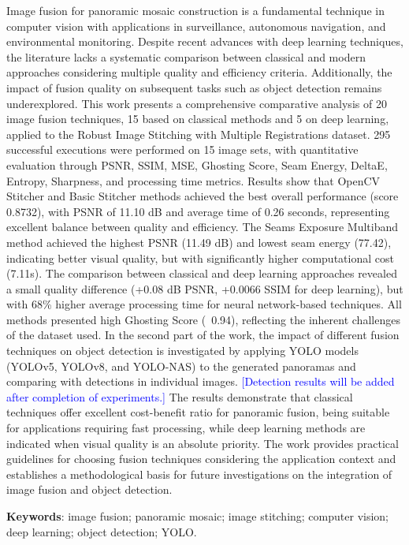 
\begin{abstractutfpr}%

Image fusion for panoramic mosaic construction is a fundamental technique in computer vision with applications in surveillance, autonomous navigation, and environmental monitoring. Despite recent advances with deep learning techniques, the literature lacks a systematic comparison between classical and modern approaches considering multiple quality and efficiency criteria. Additionally, the impact of fusion quality on subsequent tasks such as object detection remains underexplored. This work presents a comprehensive comparative analysis of 20 image fusion techniques, 15 based on classical methods and 5 on deep learning, applied to the Robust Image Stitching with Multiple Registrations dataset. 295 successful executions were performed on 15 image sets, with quantitative evaluation through PSNR, SSIM, MSE, Ghosting Score, Seam Energy, DeltaE, Entropy, Sharpness, and processing time metrics. Results show that OpenCV Stitcher and Basic Stitcher methods achieved the best overall performance (score 0.8732), with PSNR of 11.10 dB and average time of 0.26 seconds, representing excellent balance between quality and efficiency. The Seams Exposure Multiband method achieved the highest PSNR (11.49 dB) and lowest seam energy (77.42), indicating better visual quality, but with significantly higher computational cost (7.11s). The comparison between classical and deep learning approaches revealed a small quality difference (+0.08 dB PSNR, +0.0066 SSIM for deep learning), but with 68\% higher average processing time for neural network-based techniques. All methods presented high Ghosting Score (~0.94), reflecting the inherent challenges of the dataset used. In the second part of the work, the impact of different fusion techniques on object detection is investigated by applying YOLO models (YOLOv5, YOLOv8, and YOLO-NAS) to the generated panoramas and comparing with detections in individual images. \textcolor{blue}{[Detection results will be added after completion of experiments.]} The results demonstrate that classical techniques offer excellent cost-benefit ratio for panoramic fusion, being suitable for applications requiring fast processing, while deep learning methods are indicated when visual quality is an absolute priority. The work provides practical guidelines for choosing fusion techniques considering the application context and establishes a methodological basis for future investigations on the integration of image fusion and object detection.

\vspace{1em}

\noindent\textbf{Keywords}: image fusion; panoramic mosaic; image stitching; computer vision; deep learning; object detection; YOLO.

\end{abstractutfpr}
